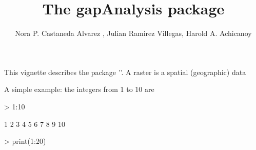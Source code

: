 \documentclass[a4paper]{article}
\title{The gapAnalysis package}
\author{Nora P. Castaneda Alvarez , Julian Ramirez Villegas, Harold A. Achicanoy}
\begin{document}



\maketitle

This vignette describes the \R package '\verb@raster@'. A raster is a spatial (geographic) data

A simple example: the integers from 1 to 10 are
\begin{Schunk}
\begin{Sinput}
> 1:10
\end{Sinput}
\begin{Soutput}
 [1]  1  2  3  4  5  6  7  8  9 10
\end{Soutput}
\end{Schunk}
\begin{Schunk}
\begin{Sinput}
> print(1:20)
\end{Sinput}
\end{Schunk}
\end{document}
